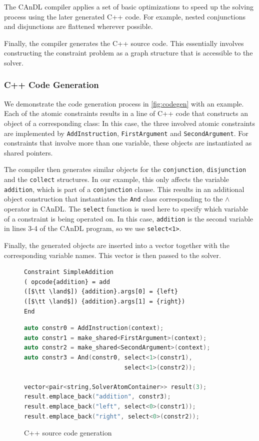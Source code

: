     The CAnDL compiler applies a set of basic optimizations to speed up the
    solving process using the later generated C++ code.
    For example, nested conjunctions and disjunctions are flattened wherever
    possible.

    Finally, the compiler generates the C++ source code.
    This essentially involves constructing the constraint problem as a graph
    structure that is accessible to the solver.

\subsubsection{C++ Code Generation}

    We demonstrate the code generation process in \autoref{fig:codegen} with an
    example.
    Each of the atomic constraints results in a line of C++ code that constructs
    an object of a corresponding class:
    In this case, the three involved atomic constraints are implemented by
    \texttt{AddInstruction}, \texttt{FirstArgument} and \texttt{SecondArgument}.
    For constraints that involve more than one variable, these objects are
    instantiated as shared pointers.

    The compiler then generates similar objects for the
    \texttt{conjunction}, \texttt{disjunction} and the \texttt{collect} structures.
    In our example, this only affects the variable \texttt{addition}, which is
    part of a \texttt{conjunction} clause.
    This results in an additional object construction that instantiates the
    \texttt{And} class corresponding to the {\bf $\land$} operator in CAnDL.
    The \texttt{select} function is used here to specify which variable of a
    constraint is being operated on.
    In this case, \texttt{addition} is the second variable in lines 3-4 of the
    CAnDL program, so we use \texttt{select<1>}.

    Finally, the generated objects are inserted into a vector together with the
    corresponding variable names.
    This vector is then passed to the solver.

\begin{figure}[ht]
\centering
\begin{lstlisting}[language=CAnDL]
Constraint SimpleAddition
( opcode{addition} = add
([$\tt \land$]) {addition}.args[0] = {left}
([$\tt \land$]) {addition}.args[1] = {right})
End
\end{lstlisting}
\begin{lstlisting}[language=C++]
auto constr0 = AddInstruction(context);
auto constr1 = make_shared<FirstArgument>(context);
auto constr2 = make_shared<SecondArgument>(context);
auto constr3 = And(constr0, select<1>(constr1),
                            select<1>(constr2));

vector<pair<string,SolverAtomContainer>> result(3);
result.emplace_back("addition", constr3);
result.emplace_back("left", select<0>(constr1));
result.emplace_back("right", select<0>(constr2));
\end{lstlisting}
\vspace{-0.3cm}
\caption{C++ source code generation}
\label{fig:codegen}
\end{figure}

